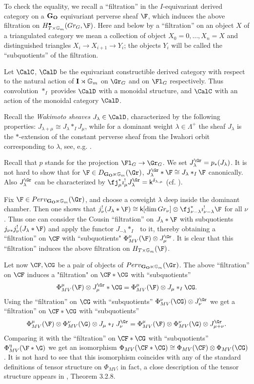 \documentclass[11pt]{amsart}
\theoremstyle{definition}
\theoremstyle{remark}
\theoremstyle{remark}
\newcommand{\bu}{\bullet}
\newcommand{\<}{\langle}
\renewcommand{\>}{\rangle}
\newcommand{\bI}{{\bf I}}
\newcommand{\GO}{{\bf G_O}}
\newcommand{\Gm}{{{\mathbb G}_m}}
\newcommand{\kk}{\mathsf k}
\newcommand{\la}{\lambda}
\begin{document}
To check the equality, we recall a ``filtration'' in the $I$-equivariant
 derived category
on a $\GO$ equivariant perverse sheaf $\F$, which induces the above filtration
on $H^\bu_{T\times \Gm}(Gr_G,\F)$. Here and below by a ``filtration''
on an object $X$ of a triangulated category we mean a collection
of object $X_0=0,\dots, X_n=X$ and distinguished triangles
$X_i\to X_{i+1} \to Y_i$; the objects $Y_i$ will be called the ``subquotients''
of the filtration.

 Let $\CalC$, $\CalD$ be  the equivariant constructible derived category
with respect to the natural action of $\bI\rtimes\Gm$ on $\Gr_G$ and
 on $\Fl_G$ respectively.
Thus convolution $*_I$ provides
$\CalD$ with a monoidal structure, and $\CalC$
with an action of the monoidal  category $\CalD$.

Recall the {\em Wakimoto sheaves} $J_\la\in \CalD$, characterized by the
following properties: $J_{\la+\mu}\cong J_\la *_I J_\mu$, while for
 a dominant weight $\la \in \Lambda^+$ the sheaf
$J_\la$ is the $*$-extension
of the constant perverse sheaf from the Iwahori orbit corresponding to $\la$,
 see, e.g. \cite{AB}.


Recall that $p$ stands for the projection $\Fl_G\to\Gr_G$.
We set $J_\la^{\Gr}=p_*(J_\la)$. It is not hard to show
that for $\F\in D_{\GO\ltimes \Gm}(\Gr)$, $J_\la^{\Gr}*\F\cong J_\la*_I \F$
canonically. Also $J^{\Gr}_\la$ can be characterized by 
$\fj_\mu^*\imath_\mu^!J_\la^{\Gr} = \kk^{\delta_{\la,\mu}}$
(cf. \cite{AB}).

Fix $\F\in Perv_ {\GO\ltimes \Gm}(\Gr)$, and choose a coweight 
$\la$ deep inside the
dominant chamber. Then one shows that $j_\nu^!(J_\la*\F)\cong 
\kk[\dim Gr_\nu] \otimes \fj_{\nu-\la}^* \imath_{\nu-\la}^!\F$
for all $\nu$. Thus one can consider the Cousin ``filtration'' 
on $J_\la*\F$ with subquotients $j_{\nu*}j_\nu^! (J_\la*\F)$ and
apply the functor $J_{-\la}*_I\ \ $ to it, thereby obtaining
a ``filtration'' on $\CF$  with ``subquotients"
$\Phi_{MV}^\mu(\F)\otimes J_\mu^{\Gr}$. It is clear that this
``filtration'' induces the above filtration on $H_{T\times \Gm}(\F)$.

Let now $\CF,\CG$ be a pair of objects of $Perv_{\GO\ltimes \Gm}(\Gr)$.
The above ``filtration'' on $\CF$ induces a "filtration" on $\CF*\CG$
with ``subquotients'' 
$$\Phi_{MV}^\mu(\F)\otimes J_\mu^{\Gr} *\CG=
\Phi_{MV}^\mu(\F)\otimes J_\mu*_I \CG.$$
Using the ``filtration'' on $\CG$ with ``subquotients'' 
$\Phi_{MV}^\nu(\CG)\otimes
J_\nu^{\Gr}$ we get a ``filtration'' on $\CF*\CG$ with ``subquotients''
$$\Phi_{MV}^\mu(\F)\otimes \Phi_{MV}^\nu(\G) \otimes J_\mu*_I J_\nu^{\Gr}=
\Phi_{MV}^\mu(\F)\otimes \Phi_{MV}^\nu(\G) \otimes J_{\mu+\nu}^{\Gr}.$$
Comparing it with the ``filtration'' on $\CF*\CG$
with ``subquotients'' $\Phi_{MV}^\eta (\F*\G)$ we get an isomorphism
$\Phi_{MV}(\CF*\CG)\cong \Phi_{MV}(\CF)\otimes \Phi_{MV}(\CG)$.
It is not hard to see that this isomorphism coincides with any of the standard
definitions of tensor structure on $\Phi_{MV}$; in fact, a close
description of the tensor structure appears in \cite{BG},  Theorem 3.2.8.
\end{document}
